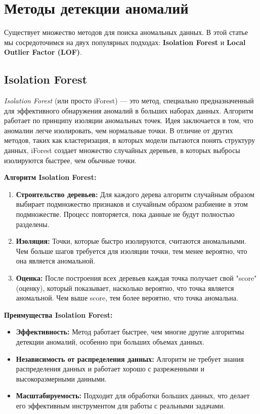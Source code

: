\section{Методы детекции аномалий}
Существует множество методов для поиска аномальных данных. В этой статье мы сосредоточимся на двух популярных подходах: \textbf{Isolation Forest} и \textbf{Local Outlier Factor (LOF)}.

\subsection{Isolation Forest}
\textit{Isolation Forest} (или просто iForest) — это метод, специально предназначенный для эффективного обнаружения аномалий в больших наборах данных. Алгоритм работает по принципу изоляции аномальных точек. Идея заключается в том, что аномалии легче изолировать, чем нормальные точки. В отличие от других методов, таких как кластеризация, в которых модели пытаются понять структуру данных, iForest создает множество случайных деревьев, в которых выбросы изолируются быстрее, чем обычные точки.

\textbf{Алгоритм Isolation Forest:}
\begin{enumerate}
    \item \textbf{Строительство деревьев:} Для каждого дерева алгоритм случайным образом выбирает подмножество признаков и случайным образом разбиение в этом подмножестве. Процесс повторяется, пока данные не будут полностью разделены.
    \item \textbf{Изоляция:} Точки, которые быстро изолируются, считаются аномальными. Чем больше шагов требуется для изоляции точки, тем менее вероятно, что она является аномальной.
    \item \textbf{Оценка:} После построения всех деревьев каждая точка получает свой "score" (оценку), который показывает, насколько вероятно, что точка является аномальной. Чем выше score, тем более вероятно, что точка аномальна.
\end{enumerate}

\textbf{Преимущества Isolation Forest:}
\begin{itemize}
    \item \textbf{Эффективность:} Метод работает быстрее, чем многие другие алгоритмы детекции аномалий, особенно при больших объемах данных.
    \item \textbf{Независимость от распределения данных:} Алгоритм не требует знания распределения данных и работает хорошо с разреженными и высокоразмерными данными.
    \item \textbf{Масштабируемость:} Подходит для обработки больших данных, что делает его эффективным инструментом для работы с реальными задачами.
\end{itemize}

